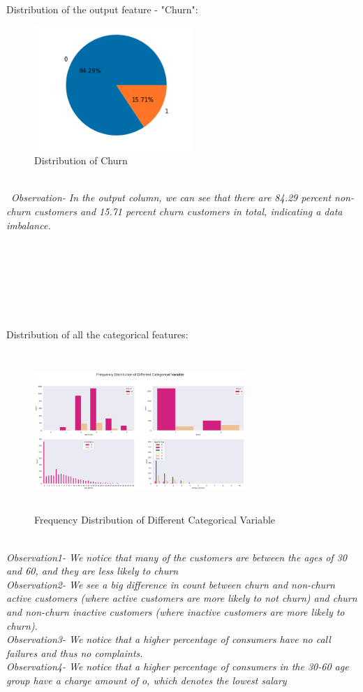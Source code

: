 \documentclass[a4paper, 10pt, conference]{ieeeconf}      %
\begin{document}
\\\
\\Distribution of the output feature - "Churn":
\begin{figure}[htp]
    \centering
    \includegraphics[width=6cm]{Images/Churn_distribution.png}
    \caption{Distribution of Churn}
\end{figure}
\\\
\textit{Observation- In the output column, we can see that there are 84.29 percent non-churn customers and 15.71 percent churn customers in total, indicating a data imbalance.}
\\
\\
\\
\\
\\
\\
\\
\\Distribution of all the categorical features:
\begin{figure}[htp]
    \centering
    \includegraphics[width=8cm,height=6cm]{Images/frequencyDistribution.png}
    \caption{Frequency Distribution of Different Categorical Variable}
    \label{fig:frequencyDistribution}
\end{figure}
\\\textit{Observation1- We notice that many of the customers are between the ages of 30 and 60, and they are less likely to churn
\\Observation2- We see a big difference in count between churn and non-churn active customers (where active customers are more likely to not churn) and churn and non-churn inactive customers (where inactive customers are more likely to churn).
 \\Observation3- We notice that a higher percentage of consumers have no call failures and thus no complaints.
\\Observation4- We notice that a higher percentage of consumers in the 30-60 age group have a charge amount of o, which denotes the lowest salary}
\end{document}
